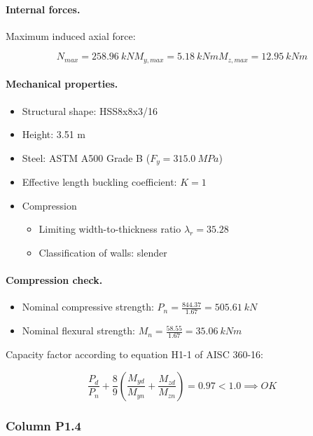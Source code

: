\paragraph{Internal forces.}

\noindent Maximum induced axial force:

\begin{equation}
  N_{max}= 258.96\ kN
  M_{y,max}= 5.18\ kN m
  M_{z,max}= 12.95\ kN m
\end{equation}

\paragraph{Mechanical properties.}

\begin{itemize}
\item Structural shape: HSS8x8x3/16
\item Height: 3.51 m
\item Steel: ASTM A500 Grade B ($F_y= 315.0\ MPa$)
\item Effective length buckling coefficient: $K= 1$
\item Compression
\begin{itemize}
  \item Limiting width-to-thickness ratio $\lambda_r= 35.28$
  \item Classification of walls: slender
\end{itemize}
\end{itemize}

\paragraph{Compression check.}

\begin{itemize}
\item Nominal compressive strength: $P_n= \frac{844.37}{1.67}= 505.61\ kN$
\item Nominal flexural strength: $M_n= \frac{58.55}{1.67}= 35.06\ kN m$
\end{itemize}

\noindent Capacity factor according to equation H1-1 of AISC 360-16:

\begin{equation}
  \frac{P_d}{P_n}+\frac{8}{9} (\frac{M_{yd}}{M_{yn}}+\frac{M_{zd}}{M_{zn}})= 0.97 < 1.0 \implies OK
  \end{equation}

\subsubsection{Column P1.4}

